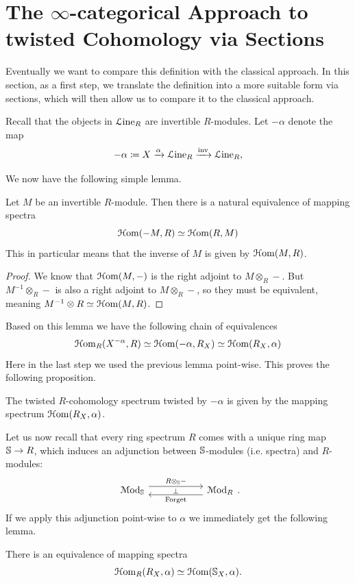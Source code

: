 \documentclass[10pt]{amsart}
\begin{document}
\section{The \texorpdfstring{$\infty$}{oo}-categorical Approach to twisted Cohomology via Sections}
Eventually we want to compare this definition with the classical approach. In this section, as a first step, we translate the definition into a more suitable form via sections, which will then allow us to compare it to the classical approach. 

Recall that the objects in $\mathcal{L}\mathrm{ine}_R$ are invertible $R$-modules. Let $-\alpha$ denote the map 
\[ - \alpha\coloneq X \xrightarrow{\alpha} \mathcal{L}\mathrm{ine}_R \xrightarrow{\mathrm{inv}} \mathcal{L}\mathrm{ine}_R, \]

We now have the following simple lemma. 

\begin{lemma}
	Let $M$ be an invertible	$R$-module. Then there is a natural equivalence of mapping spectra
	\[ \mathcal{H}\mathrm{om}(-M,R) \simeq \mathcal{H}\mathrm{om}(R,M) \] 
 This in particular means that the inverse of $M$ is given by $\mathcal{H}\mathrm{om}(M,R)$.
\end{lemma}

\begin{proof}
 We know that $\mathcal{H}\mathrm{om}(M,-)$ is the right adjoint to $M \otimes_R -$. But $M^{-1} \otimes_R -$ is also a right adjoint to $M \otimes_R -$, so they must be equivalent, meaning $M^{-1} \otimes R \simeq \mathcal{H}\mathrm{om}(M,R)$.  
\end{proof}

Based on this lemma we have the following chain of equivalences 
\[ \mathcal{H}\mathrm{om}_R(X^{-\alpha},R) \simeq \mathcal{H}\mathrm{om}(-\alpha,R_X) \simeq \mathcal{H}\mathrm{om}(R_X,\alpha) \]
Here in the last step we used the previous lemma point-wise. This proves the following proposition.

\begin{proposition}
	 The twisted $R$-cohomology spectrum twisted by $-\alpha$ is given by the mapping spectrum $\mathcal{H}\mathrm{om}(R_X,\alpha)$.
\end{proposition}

Let us now recall that every ring spectrum $R$ comes with a unique ring map $\mathbb{S} \to R$, which induces an adjunction between $\mathbb{S}$-modules (i.e. spectra) and $R$-modules:
\[
\begin{tikzcd}[column sep=2cm]
	\Mod_{\bS} \arrow[r, shift left=1.8, "R \otimes_{\bS} -", "\bot"'] & \Mod_R \arrow[l, shift left=1.8, "\text{Forget}"]
\end{tikzcd}.
\]
If we apply this adjunction point-wise to $\alpha$ we immediately get the following lemma.
\begin{lemma}
	There is an equivalence of mapping spectra \[ \mathcal{H}\mathrm{om}_R(R_X,\alpha) \simeq \mathcal{H}\mathrm{om}(\mathbb{S}_X,\alpha). \]
\end{lemma}
\end{document}
